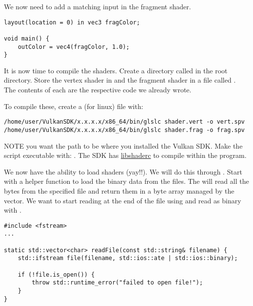 \par We now need to add a matching input in the fragment shader.

\begin{center}
\begin{minipage}{0.95\linewidth}
\begin{lstlisting}
layout(location = 0) in vec3 fragColor;

void main() {
    outColor = vec4(fragColor, 1.0);
}
\end{lstlisting}
\end{minipage}
\end{center}

\par It is now time to compile the shaders. Create a directory called  in the root directory. Store the vertex shader in  and the fragment shader in a file called . The contents of each are the respective code we already wrote.

\par To compile these, create a  (for linux) file with:

\begin{center}
\begin{minipage}{0.95\linewidth}
\begin{lstlisting}
/home/user/VulkanSDK/x.x.x.x/x86_64/bin/glslc shader.vert -o vert.spv
/home/user/VulkanSDK/x.x.x.x/x86_64/bin/glslc shader.frag -o frag.spv
\end{lstlisting}
\end{minipage}
\end{center}

\par NOTE you want the path to be where you installed the Vulkan SDK. Make the script executable with: . The SDK has \href{https://github.com/google/shaderc}{libshaderc} to compile within the program.

\par We now have the ability to load shaders (yay!!). We will do this through . Start with a helper function to load the binary data from the files. The  will read all the bytes from the specified file and return them in a byte array managed by the vector. We want to start reading at the end of the file using  and read as binary with .

\begin{center}
\begin{minipage}{0.95\linewidth}
\begin{lstlisting}
#include <fstream>
...

static std::vector<char> readFile(const std::string& filename) {
    std::ifstream file(filename, std::ios::ate | std::ios::binary);

    if (!file.is_open()) {
        throw std::runtime_error("failed to open file!");
    }
}
\end{lstlisting}
\end{minipage}
\end{center}

